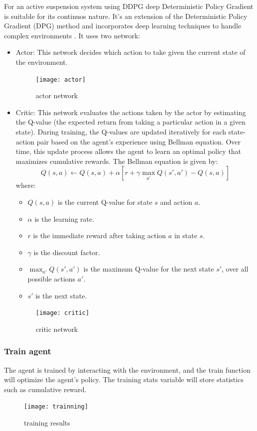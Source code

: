 For an active suspension system using DDPG deep Deterministic Policy Gradient is suitable for its continuos nature. It's an extension of the Deterministic Policy Gradient (DPG) method and incorporates deep learning techniques to handle complex environments . It uses two network:
\begin{itemize}
	\item Actor: This network decides which action to take given the current state of the environment.
	\begin{figure}[H]
		\centering
		\texttt{[image: actor]}
		\caption{actor network  }
	\end{figure}
	\item Critic: This network evaluates the actions taken by the actor by estimating the Q-value (the expected return from taking a particular action in a given state).
	During training, the Q-values are updated iteratively for each state-action pair based on the agent’s experience using Bellman equation. Over time, this update process allows the agent to learn an optimal policy that maximizes cumulative rewards. The Bellman equation is given by:
	\[ Q(s, a) \leftarrow Q(s, a) + \alpha \left[ r + \gamma \max_{a'} Q(s', a') - Q(s, a) \right] \] where: \begin{itemize} \item \( Q(s, a) \) is the current Q-value for state \( s \) and action \( a \). \item \( \alpha \) is the learning rate. \item \( r \) is the immediate reward after taking action \( a \) in state \( s \). \item \( \gamma \) is the discount factor. \item \( \max_{a'} Q(s', a') \) is the maximum Q-value for the next state \( s' \), over all possible actions \( a' \). \item \( s' \) is the next state. \end{itemize}
	\begin{figure}[H]
		\centering
		\texttt{[image: critic]}
		\caption{critic network  }
	\end{figure}
\end{itemize}

\newpage
\subsubsection{Train agent}
The agent is trained by interacting with the environment, and the train function will optimize the agent’s policy. The training stats variable will store statistics such as cumulative reward.
\begin{figure}[H]
	\centering
	\texttt{[image: trainning]}
	\caption{training results }
\end{figure}

